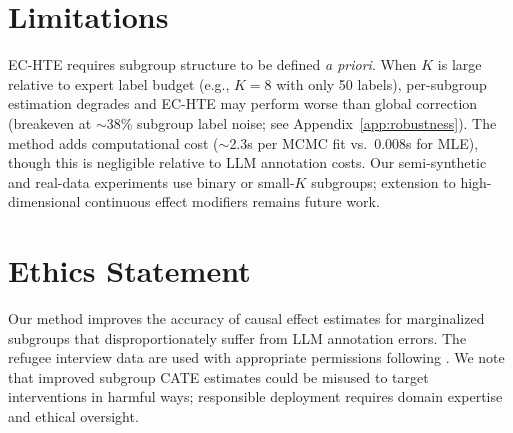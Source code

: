 \documentclass[11pt,a4paper]{article}
\begin{document}
\section*{Limitations}

EC-HTE requires subgroup structure to be defined \emph{a priori}. When $K$ is large relative to expert label budget (e.g., $K=8$ with only 50 labels), per-subgroup estimation degrades and EC-HTE may perform worse than global correction (breakeven at $\sim$38\% subgroup label noise; see Appendix~\ref{app:robustness}). The method adds computational cost ($\sim$2.3s per MCMC fit vs.\ 0.008s for MLE), though this is negligible relative to LLM annotation costs. Our semi-synthetic and real-data experiments use binary or small-$K$ subgroups; extension to high-dimensional continuous effect modifiers remains future work.

\section*{Ethics Statement}

Our method improves the accuracy of causal effect estimates for marginalized subgroups that disproportionately suffer from LLM annotation errors. The refugee interview data are used with appropriate permissions following \citet{ashwin2025refugee}. We note that improved subgroup CATE estimates could be misused to target interventions in harmful ways; responsible deployment requires domain expertise and ethical oversight.
\end{document}
